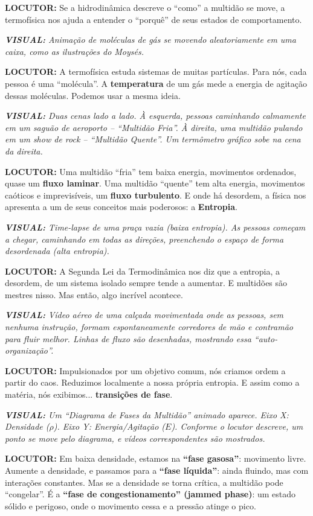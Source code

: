 \documentclass[a4paper, 10pt]{article}
\newcommand{\locutor}[1]{%
	\par\noindent\textcolor{locutorgray}{\textbf{LOCUTOR:} #1}%
}
\newcommand{\visual}[1]{%
	\par\noindent\textcolor{visualblue}{\textit{\textbf{VISUAL:} #1}}%
}
\begin{document}
	\locutor{Se a hidrodinâmica descreve o ``como'' a multidão se move, a termofísica nos ajuda a entender o ``porquê'' de seus estados de comportamento.}
	
	\visual{Animação de moléculas de gás se movendo aleatoriamente em uma caixa, como as ilustrações do Moysés.}
	
	\locutor{A termofísica estuda sistemas de muitas partículas. Para nós, cada pessoa é uma ``molécula''. A \textbf{temperatura} de um gás mede a energia de agitação dessas moléculas. Podemos usar a mesma ideia.}
	
	\visual{Duas cenas lado a lado. À esquerda, pessoas caminhando calmamente em um saguão de aeroporto -- ``Multidão Fria''. À direita, uma multidão pulando em um show de rock -- ``Multidão Quente''. Um termômetro gráfico sobe na cena da direita.}
	
	\locutor{Uma multidão ``fria'' tem baixa energia, movimentos ordenados, quase um \textbf{fluxo laminar}. Uma multidão ``quente'' tem alta energia, movimentos caóticos e imprevisíveis, um \textbf{fluxo turbulento}. E onde há desordem, a física nos apresenta a um de seus conceitos mais poderosos: a \textbf{Entropia}.}
	
	\visual{Time-lapse de uma praça vazia (baixa entropia). As pessoas começam a chegar, caminhando em todas as direções, preenchendo o espaço de forma desordenada (alta entropia).}
	
	\locutor{A Segunda Lei da Termodinâmica nos diz que a entropia, a desordem, de um sistema isolado sempre tende a aumentar. E multidões são mestres nisso. Mas então, algo incrível acontece.}
	
	\visual{Vídeo aéreo de uma calçada movimentada onde as pessoas, sem nenhuma instrução, formam espontaneamente corredores de mão e contramão para fluir melhor. Linhas de fluxo são desenhadas, mostrando essa ``auto-organização''.}
	
	\locutor{Impulsionados por um objetivo comum, nós criamos ordem a partir do caos. Reduzimos localmente a nossa própria entropia. E assim como a matéria, nós exibimos... \textbf{transições de fase}.}
	
	\visual{Um ``Diagrama de Fases da Multidão'' animado aparece. Eixo X: Densidade ($\rho$). Eixo Y: Energia/Agitação ($E$). Conforme o locutor descreve, um ponto se move pelo diagrama, e vídeos correspondentes são mostrados.}
	
	\locutor{Em baixa densidade, estamos na \textbf{``fase gasosa''}: movimento livre. Aumente a densidade, e passamos para a \textbf{``fase líquida''}: ainda fluindo, mas com interações constantes. Mas se a densidade se torna crítica, a multidão pode ``congelar''. É a \textbf{``fase de congestionamento'' (jammed phase)}: um estado sólido e perigoso, onde o movimento cessa e a pressão atinge o pico.}
	
\end{document}
